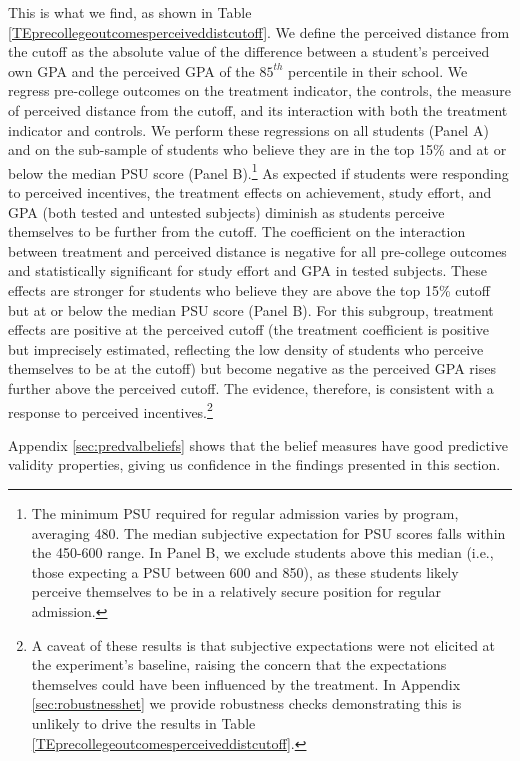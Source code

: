This is what we find, as shown in Table \ref{TEprecollegeoutcomesperceiveddistcutoff}. We define the perceived distance from the cutoff as the absolute value of the difference between a student's perceived own GPA and the perceived GPA of the $85^{th} $ percentile in their school. 
We regress pre-college outcomes on the treatment indicator, the controls, the measure of perceived distance from the cutoff, and its interaction with both the treatment indicator and controls. 
We perform these regressions on all students (Panel A) and on the sub-sample of students who believe they are in the top 15\% and at or below the median PSU score (Panel B).\footnote{The minimum PSU required for regular admission varies by program, averaging 480. The median subjective expectation for PSU scores falls within the 450-600 range. In Panel B, we exclude students above this median (i.e., those expecting a PSU between 600 and 850), as these students likely perceive themselves to be in a relatively secure position for regular admission.} As expected if students were responding to perceived incentives, the treatment effects on achievement, study effort, and GPA (both tested and untested subjects) diminish as students perceive themselves to be further from the cutoff. The coefficient on the interaction between treatment and perceived distance is negative for all pre-college outcomes and statistically significant for study effort and GPA in tested subjects. These effects are stronger for students who believe they are above the top 15\% cutoff but at or below the median PSU score (Panel B). For this subgroup, treatment effects are positive at the perceived cutoff (the treatment coefficient is positive but imprecisely estimated, reflecting the low density of students who perceive themselves to be at the cutoff) but become negative as the perceived GPA rises further above the perceived cutoff. The evidence, therefore, is consistent with a response to perceived incentives.\footnote{A caveat of these results is that subjective expectations were not elicited at the experiment's baseline, raising the concern that the expectations themselves could have been influenced by the treatment. In Appendix \ref{sec:robustnesshet} we provide robustness checks demonstrating this is unlikely to drive the results in Table \ref{TEprecollegeoutcomesperceiveddistcutoff}.}


Appendix \ref{sec:predvalbeliefs} shows that the belief measures have good predictive validity properties, giving us confidence in the findings presented in this section.



